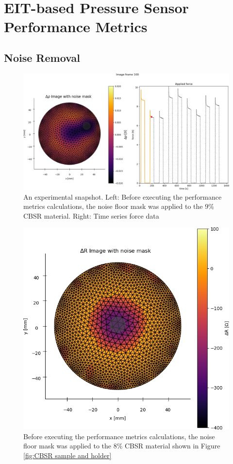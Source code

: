 \chapter{EIT-based Pressure Sensor Performance Metrics}
\label{appendix-D}

\section{Noise Removal}
\begin{figure}[H]
	\centering
	\includegraphics[width=\linewidth]{Figures/CBSR_9p_2_9push_25strain_60s_1mA_4_frame100_noise_mask.jpg}
	\caption{An experimental snapshot. Left: Before executing the performance metrics calculations, the noise floor mask was applied to the 9\% CBSR material. Right: Time series force data}
	\label{fig:noise_floor_mask_9p}
\end{figure}
\begin{figure}[H]
	\centering
	\includegraphics[width=0.6\linewidth]{Figures/CBSR_8p_9push_20strain_60s_4_frame20_noise_mask.jpg}
	\caption{Before executing the performance metrics calculations, the noise floor mask was applied to the 8\% CBSR material shown in Figure \ref{fig:CBSR sample and holder}}
	\label{fig:noise_floor_mask_8p}
\end{figure}


